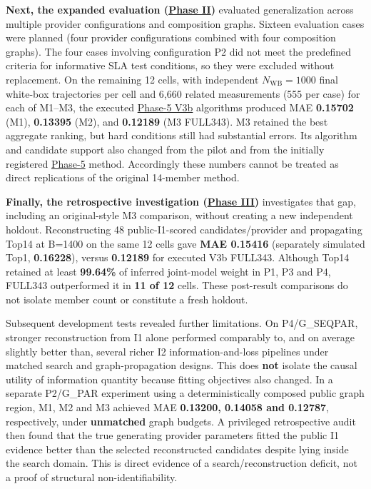 \documentclass[10pt,a4paper]{article}
\begin{document}
\textbf{Next, the expanded evaluation (\hyperref[app:experiment-stages]{Phase II})} evaluated generalization across multiple provider configurations and composition graphs. Sixteen evaluation cases were planned (four provider configurations combined with four composition graphs). The four cases involving configuration P2 did not meet the predefined criteria for informative SLA test conditions, so they were excluded without replacement. On the remaining 12 cells, with independent $N_{\mathrm{WB}}=1000$ final white-box trajectories per cell and 6,660 related measurements (555 per case) for each of M1--M3, the executed \hyperref[app:experiment-stages]{Phase-5 V3b} algorithms produced MAE \textbf{0.15702} (M1), \textbf{0.13395} (M2), and \textbf{0.12189} (M3 FULL343). M3 retained the best aggregate ranking, but hard conditions still had substantial errors. Its algorithm and candidate support also changed from the pilot and from the initially registered \hyperref[app:experiment-stages]{Phase-5} method. Accordingly these numbers cannot be treated as direct replications of the original 14-member method.

\textbf{Finally, the retrospective investigation (\hyperref[app:experiment-stages]{Phase III})} investigates that gap, including an original-style M3 comparison, without creating a new independent holdout. Reconstructing 48 public-I1-scored candidates/provider and propagating Top14 at B=1400 on the same 12 cells gave \textbf{MAE 0.15416} (separately simulated Top1, \textbf{0.16228}), versus \textbf{0.12189} for executed V3b FULL343. Although Top14 retained at least \textbf{99.64\%} of inferred joint-model weight in P1, P3 and P4, FULL343 outperformed it in \textbf{11 of 12} cells. These post-result comparisons do not isolate member count or constitute a fresh holdout.

Subsequent development tests revealed further limitations. On P4/G\_SEQPAR, stronger reconstruction from I1 alone performed comparably to, and on average slightly better than, several richer I2 information-and-loss pipelines under matched search and graph-propagation designs. This does \textbf{not} isolate the causal utility of information quantity because fitting objectives also changed. In a separate P2/G\_PAR experiment using a deterministically composed public graph region, M1, M2 and M3 achieved MAE \textbf{0.13200, 0.14058 and 0.12787}, respectively, under \textbf{unmatched} graph budgets. A privileged retrospective audit then found that the true generating provider parameters fitted the public I1 evidence better than the selected reconstructed candidates despite lying inside the search domain. This is direct evidence of a search/reconstruction deficit, not a proof of structural non-identifiability.
\end{document}
